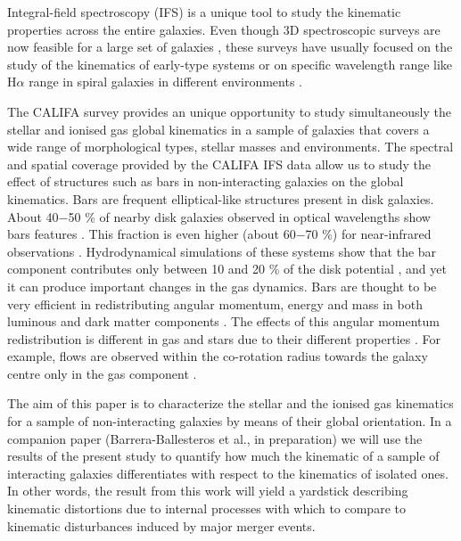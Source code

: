 \documentclass[longauth,traditabstract]{aa}
\begin{document}
Integral-field spectroscopy (IFS) is a unique tool to study the kinematic
properties across the entire galaxies. Even though 3D spectroscopic surveys are now feasible for a large set of galaxies  \citep[e.g.: GHASP, GH$\alpha$FaS, ATLAS$^{\mathrm{3D}}$,  SAMI; ][]{2008MNRAS.388..500E, 2008PASP..120..665H, 2011MNRAS.413..813C, 2012MNRAS.421..872C}, these surveys have usually focused on the study of the kinematics of  early-type systems \citep[e.g.: SAURON, ATLAS$^{\mathrm{3D}}$; ][]{2004MNRAS.352..721E, 2011MNRAS.414.2923K} or on specific wavelength range like H$\alpha$ range in spiral galaxies in different environments \citep[e.g., GHASP, and GH$\alpha$FaS][]{2009ApJ...704.1657F, 2008MNRAS.388..500E}.

The CALIFA survey \citep{2012A&A...538A...8S} provides an unique opportunity to
study simultaneously the stellar and ionised gas global kinematics in a sample
of galaxies that covers a wide range of morphological types, stellar masses and
environments. The spectral and spatial coverage provided by the CALIFA IFS data
allow us to study the effect of structures such as bars in non-interacting
galaxies on the global kinematics. Bars are frequent elliptical-like structures
present in disk galaxies. About 40$-$50 \% of nearby disk galaxies
observed in optical wavelengths show bars features
\citep[e.g.,][]{2007AAS...211.9712M,2008ApJ...675.1194B,2009A&A...495..491A}.
This fraction is even higher (about 60$-$70 \%) for near-infrared
observations \citep[e.g.,][]{2000AJ....119..536E, 2000ApJ...529...93K,
2007ApJ...657..790M}. Hydrodynamical simulations of these systems show that the
bar component contributes only between 10 and 20 \% of the disk potential
\citep[e.g., ][]{2010MNRAS.407L..41S}, and yet it can produce important changes
in the gas dynamics. Bars are thought to be very efficient in redistributing
angular momentum, energy and mass in both luminous and dark matter components
\citep[e.g.,][]{1985MNRAS.213..451W, 1998ApJ...493L...5D,
2000ApJ...543..704D,2003MNRAS.341.1179A,2006ApJ...637..214M,
2006ApJ...637..567S, 2006ApJ...639..868S,2009ApJ...707..218V}. The effects of
this angular momentum redistribution is different in gas and stars due to their
different properties \citep[e.g.,][]{1982MNRAS.199..151T}. For example, flows
are observed within the co-rotation radius towards the galaxy centre only in the
gas component \citep[e.g.,][]{2002A&A...386...42R}.

The aim of this paper is to characterize the stellar and the ionised gas kinematics for a sample of non-interacting galaxies by means of their global orientation. In a companion paper (Barrera-Ballesteros et al., in preparation) we will use the results of the present study to quantify how much the kinematic of a sample of interacting galaxies differentiates with respect to the kinematics of isolated ones. In other words, the result from this work will yield a yardstick describing kinematic distortions due to internal processes with which to compare to kinematic disturbances induced by major merger events. 
\end{document}

